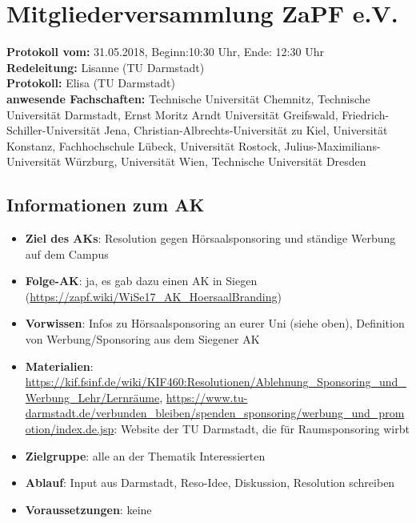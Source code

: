 
\section{Mitgliederversammlung ZaPF e.V.}

	\textbf{Protokoll vom:} 31.05.2018,
	Beginn:10:30 Uhr,
	Ende: 12:30 Uhr \\
	\textbf{Redeleitung:} Lisanne (TU Darmstadt) \\
	\textbf{Protokoll:} Elisa (TU Darmstadt) \\
	\textbf{anwesende Fachschaften:} Technische Universität Chemnitz, Technische Universität Darmstadt, Ernst Moritz Arndt Universität Greifswald, Friedrich-Schiller-Universität Jena, Christian-Albrechts-Universität zu Kiel, Universität Konstanz, Fachhochschule Lübeck, Universität Rostock, Julius-Maximilians-Universität Würzburg, Universität Wien, Technische Universität Dresden

	\subsection*{Informationen zum AK}
		\begin{itemize}
			\item \textbf{Ziel des AKs}: Resolution gegen Hörsaalsponsoring und ständige Werbung auf dem Campus
			\item \textbf{Folge-AK}:  ja, es gab dazu einen AK in Siegen (\url{https://zapf.wiki/WiSe17_AK_HoersaalBranding})
			\item \textbf{Vorwissen}: Infos zu Hörsaalsponsoring an eurer Uni (siehe oben), Definition von Werbung/Sponsoring aus dem Siegener AK
      \item \textbf{Materialien}: \url{https://kif.fsinf.de/wiki/KIF460:Resolutionen/Ablehnung_Sponsoring_und_Werbung_Lehr/Lernräume}, \url{https://www.tu-darmstadt.de/verbunden_bleiben/spenden_sponsoring/werbung_und_promotion/index.de.jsp}: Website der TU Darmstadt, die für Raumsponsoring wirbt
			\item \textbf{Zielgruppe}: alle an der Thematik Interessierten
			\item \textbf{Ablauf}: Input aus Darmstadt, Reso-Idee, Diskussion, Resolution schreiben
			\item \textbf{Voraussetzungen}: keine
		\end{itemize}

